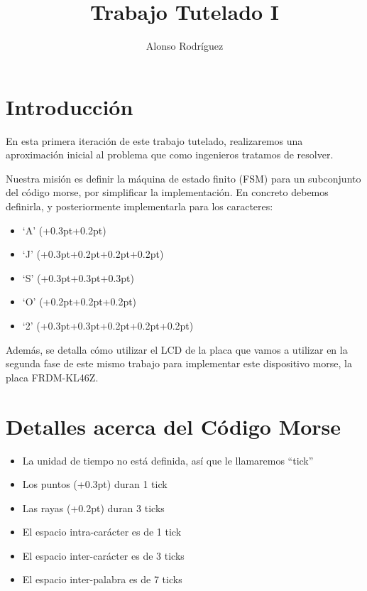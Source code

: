\documentclass[a4paper,openright,12pt]{article}
\newcommand{\punto}{\kern+0.3pt\raisebox{0.35ex}{\huge\textbf.}}
\newcommand{\raya}{\kern+0.2pt\raisebox{-0.35ex}{\huge\textbf-}}
\begin{document}
\author {Alonso Rodríguez}
\title {Trabajo Tutelado I}

\maketitle

\justifying{}

\section{Introducción}
En esta primera iteración de este trabajo tutelado, realizaremos una aproximación inicial al problema que como ingenieros
tratamos de resolver.

Nuestra misión es definir la máquina de estado finito (FSM) para un subconjunto del código morse, por simplificar la implementación.
En concreto debemos definirla, y posteriormente implementarla para los caracteres:
\begin{itemize}
    \item `A' (\punto\raya)
    \item `J' (\punto\raya\raya\raya)
    \item `S' (\punto\punto\punto)
    \item `O' (\raya\raya\raya)
    \item `2' (\punto\punto\raya\raya\raya)
\end{itemize} 

Además, se detalla cómo utilizar el LCD de la placa que vamos a utilizar en la segunda fase de este mismo trabajo para implementar este dispositivo morse,
la placa FRDM-KL46Z.

\section{Detalles acerca del Código Morse}
\begin{itemize}
    \item La unidad de tiempo no está definida, así que le llamaremos ``tick''
    \item Los puntos (\punto) duran 1 tick
    \item Las rayas (\raya) duran 3 ticks
    \item El espacio intra-carácter es de 1 tick
    \item El espacio inter-carácter es de 3 ticks
    \item El espacio inter-palabra es de 7 ticks
\end{itemize}
\end{document}

